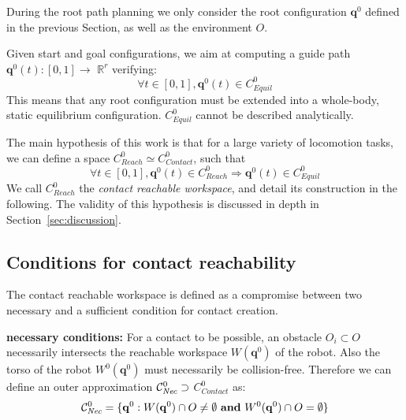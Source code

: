\documentclass[journal]{IEEEtran}
\newcommand{\gls}[1]{\textit{#1}}
\begin{document}
During the root path planning we only consider the root configuration $\mathbf{q}^0$ defined in the previous Section,
as well as the environment $O$.

Given start and goal configurations, we aim at computing a guide path $\mathbf{q}^0(t) : [0,1] \longrightarrow$ $\mathbb{R}^r$ verifying:
\begin{equation*} \label{eq:path}
\forall t \in [0,1], \mathbf{q}^0(t)  \in C_{Equil}^0
\end{equation*}
This means that any root configuration must be extended into a whole-body, static equilibrium configuration.
$C_{Equil}^0$  cannot be described analytically.

The main hypothesis of this work is that for a large variety of locomotion tasks, we can define a space  $C_{Reach}^0 \simeq C_{Contact}^0$, such that 
\begin{equation} \label{eq:creach}
\forall t \in [0,1], \mathbf{q}^0(t) \in C_{Reach}^0 \Rightarrow \mathbf{q}^0(t)  \in C_{Equil}^0
\end{equation}
We call  $C_{Reach}^0$ the \textit{contact reachable workspace}, and detail its construction in the following.
The validity of this hypothesis is discussed in depth in Section~\ref{sec:discussion}.
 
\subsection{Conditions for contact reachability}
The contact reachable workspace is defined as a compromise between two necessary and a sufficient condition for contact creation.

\textbf{necessary conditions:}
For a contact to be possible, an obstacle $O_i \subset O$ necessarily intersects the reachable workspace $W(\mathbf{q}^{0})$ of the robot. %
 Also the torso of the robot $W^0(\mathbf{q}^{0})$ must necessarily be collision-free.
Therefore we can define an outer approximation  $ \mathcal{C}^0_{\textrm{\it Nec}} \supset$ $C_{Contact}^0$ as: 
\begin{equation}
\mathcal{C}^0_{\textrm{\it Nec}} = \{ \mathbf{q}^0 : W(\mathbf{q}^{0}) \cap O \neq \emptyset \textrm{ \textbf{and}}\ W^0(\mathbf{q}^{0}) \cap O = \emptyset \} %
\end{equation}
 
\end{document}
